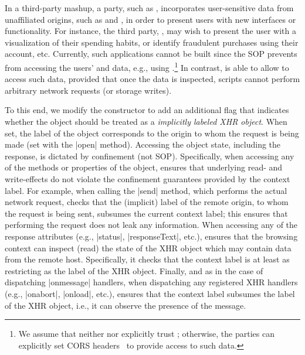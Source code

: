 In a third-party mashup, a party, such as ,
incorporates user-sensitive data from unaffiliated origins, such as
 and , in order to present users with new
interfaces or functionality.
%
For instance, the third party, , may wish to present the user with a
visualization of their spending habits, or identify fraudulent
 purchases using their  account, etc.
%
Currently, such applications cannot be built since the SOP prevents
 from accessing the users'  and
 data, e.g., using \xhr{}.\footnote{
 We assume that neither  nor 
 explicitly trust ; otherwise, the parties can
 explicitly set CORS headers~ to provide 
 access to such data.
}
%
In contrast, \sys{} is able to allow  to access such
data, provided that once the data is inspected, scripts cannot perform
arbitrary network requests (or storage writes).
 
To this end, we modify the \xhr{} constructor to add an additional
flag that indicates whether the object should be treated as a
\emph{implicitly labeled XHR object}.
%
When set, the  label of the object corresponds to the origin
to whom the request is being made (set with the \js|open| method). 
Accessing the object state, including the response, is dictated by
confinement (not SOP).
%
Specifically, when accessing any of the methods or properties of
the object, \sys{} ensures that underlying read- and write-effects do
not violate the confinement guarantees provided by the context label.
%
For example, when calling the \js|send| method, which performs the
actual network request, \sys{} checks that the (implicit) label of the
remote origin, to whom the request is being sent, subsumes the current
context label;
%
this ensures that performing the request does not leak any
information.
%
When accessing any of the response attributes (e.g., \js|status|,
\js|responseText|, etc.), \sys{} ensures that the browsing context can inspect
(read) the state of the XHR object which may contain data from the remote host.
%
Specifically, it checks that the context label is at least as
restricting as the label of the XHR object.
%
Finally, and as in the case of dispatching \js|onmessage| handlers,
when dispatching any registered XHR
handlers (e.g., \js|onabort|, \js|onload|, etc.), \sys{} ensures that the
context label subsumes the label of the XHR object, i.e., it can observe 
the presence of the message.
 
